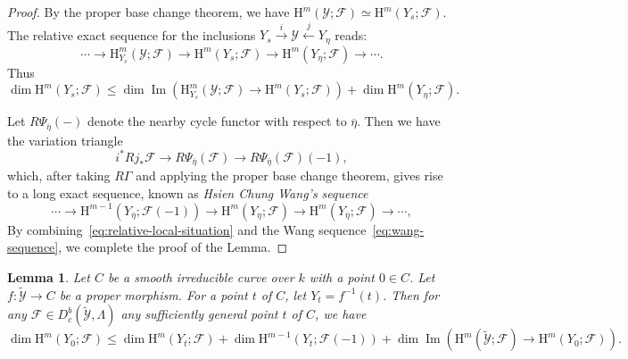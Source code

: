 \documentclass[english]{smfart}
\renewcommand{\leq}{\leqslant}
\theoremstyle{remark}
\theoremstyle{plain}
\newtheorem{lemma}[remark]{Lemma}
\theoremstyle{definition}
\numberwithin{equation}{remark}
\theoremstyle{void}
\begin{document}
\begin{proof}
By the proper base change theorem, we have
\(\mathrm{H}^{m}(\mathcal{Y};\mathcal{F}) \simeq \mathrm{H}^{m}(Y_s;\mathcal{F})\).  The
relative exact sequence for the inclusions
\(Y_s \xrightarrow{i} \mathcal{Y} \xleftarrow{j} Y_{\eta}\) reads:
\begin{equation*}
\cdots \to  \mathrm{H}^{m}_{Y_s}(\mathcal{Y};\mathcal{F}) \to \mathrm{H}^{m}(Y_s;\mathcal{F}) \to
\mathrm{H}^{m}(Y_{\eta};\mathcal{F}) \to \cdots.
\end{equation*}
Thus
\begin{equation}
\label{eq:relative-local-situation}
\dim \mathrm{H}^{m}(Y_{s};\mathcal{F}) \leq
\dim \operatorname{Im}(\mathrm{H}^{m}_{Y_{s}}(\mathcal{Y};\mathcal{F})\to\mathrm{H}^{m}(Y_{s};\mathcal{F}))
+ \dim \mathrm{H}^{m}(Y_{\eta};\mathcal{F}).
\end{equation}

Let \(R\Psi_{\overline{\eta}}(-)\) denote the nearby cycle functor
with respect to \(\overline{\eta}\).  Then we have the variation
triangle
\begin{equation*}
i^{\ast}Rj_{\ast}\mathcal{F} \to R\Psi_{\overline{\eta}}(\mathcal{F}) \to
R\Psi_{\overline{\eta}}(\mathcal{F})(-1),
\end{equation*}
which, after taking \(R\Gamma\) and applying the proper base change
theorem, gives rise to a long exact sequence, known as \emph{Hsien
Chung Wang's sequence}
\begin{equation}\label{eq:wang-sequence}
\cdots \to \mathrm{H}^{m-1}(Y_{\overline{\eta}};\mathcal{F}(-1)) \to \mathrm{H}^{m}(Y_{\eta};\mathcal{F})
\to \mathrm{H}^{m}(Y_{\overline{\eta}};\mathcal{F}) \to \cdots,
\end{equation}
By combining~\eqref{eq:relative-local-situation} and the Wang
sequence~\eqref{eq:wang-sequence}, we complete the proof of the Lemma.
\end{proof}

\begin{lemma}
\label{lemma:use-global-geometry-to-estimate-cohomology-with-support}
Let \(C\) be a smooth irreducible curve over \(k\) with a point
\(0 \in C\).  Let \(f\colon \widetilde{\mathcal{Y}} \to C\) be a proper
morphism.  For a point \(t\) of \(C\), let \(Y_t = f^{-1}(t)\).  Then
for any \(\mathcal{F} \in D^b_c(\widetilde{\mathcal{Y}},\Lambda)\) any
sufficiently general point \(t\) of \(C\), we have
\begin{equation*}
\dim \mathrm{H}^m(Y_0;\mathcal{F}) \leq
\dim \mathrm{H}^m(Y_t;\mathcal{F}) + \dim \mathrm{H}^{m-1}(Y_t;\mathcal{F}(-1))
+ \dim \operatorname{Im}(\mathrm{H}^m(\widetilde{\mathcal{Y}};\mathcal{F}) \to \mathrm{H}^m(Y_0;\mathcal{F})).
\end{equation*}
\end{lemma}
\end{document}
